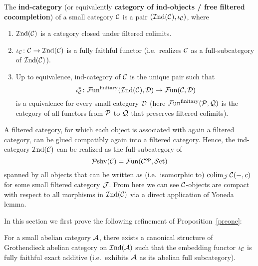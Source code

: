 \documentclass[twoside]{article}
\begin{document}
\begin{defn}
The \textbf{ind-category} (or equivalently \textbf{category of ind-objects / free filtered cocompletion}) of a small category ${\mathcal{C}}$ is a pair $(\mathcal{I}\mathrm{nd}({\mathcal{C}}), \iota_{\mathcal{C}})$, where 
\begin{enumerate}
\item $\mathcal{I}\mathrm{nd}({\mathcal{C}})$ is a category closed under filtered colimits.

\item $\iota_{\mathcal{C}}\colon {\mathcal{C}} \rightarrow  \mathcal{I}\mathrm{nd}({\mathcal{C}})$ is a fully faithful functor (i.e.\ realizes ${\mathcal{C}}$ as a full-subcategory of $\mathcal{I}\mathrm{nd}({\mathcal{C}})$).

\item Up to equivalence, ind-category of ${\mathcal{C}}$ is the unique pair such that 
$$\iota_{\mathcal{C}}^\ast\colon \mathcal{F}\mkern-2mu\mathrm{un}^{\mathrm{finitary}}(\mathcal{I}\mathrm{nd}({\mathcal{C}}), {\mathcal{D}}) \rightarrow \mathcal{F}\mkern-2mu\mathrm{un}({\mathcal{C}}, {\mathcal{D}})$$
is a equivalence for every small category ${\mathcal{D}}$ (here $ \mathcal{F}\mkern-2mu\mathrm{un}^{\mathrm{finitary}}({\mathcal{P}}, {\mathcal{Q}})$ is the category of all functors from ${\mathcal{P}}$ to ${\mathcal{Q}}$ that preserves filtered colimits).
\end{enumerate}
\end{defn}

\begin{rem}\label{rem1}
A filtered category, for which each object is associated with again a filtered category, can be glued compatibly again into a filtered category. Hence, the ind-category $\mathcal{I}\mathrm{nd}({\mathcal{C}})$ can be realized as the full-subcategory of $$\mathcal{P}\mathrm{shv}({\mathcal{C}}) = \mathcal{F}\mkern-2mu\mathrm{un}({\mathcal{C}}^{\mathrm{op}}, \mathcal{S}\mathrm{et})$$ spanned by all objects that can be written as (i.e.\ isomorphic to) $\operatorname*{\mathrm{colim}}_{{\mathcal{J}}} {\mathcal{C}}(-,c)$ for some small filtered category ${\mathcal{J}}$.
From here we can see ${\mathcal{C}}$-objects are compact with respect to all morphisms in $\mathcal{I}\mathrm{nd}({\mathcal{C}})$ via a direct application of Yoneda lemma.
\end{rem}

In this section we first prove the following refinement of Proposition~\ref{preone}:

\begin{prop}\label{preoneprime}
For a small abelian category ${\mathcal{A}}$, there exists a canonical structure of Grothendieck abelian category on $\mathcal{I}\mathrm{nd}({\mathcal{A}})$ such that the embedding functor $\iota_{\mathcal{C}}$ is fully faithful exact additive (i.e.\ exhibits ${\mathcal{A}}$ as its abelian full subcategory). 
\end{prop}

\end{document}
